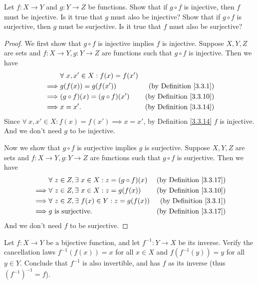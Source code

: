 \begin{exercise}\label{ex 3.3.5}
Let \(f : X \to Y\) and \(g : Y \to Z\) be functions.
Show that if \(g \circ f\) is injective, then \(f\) must be injective.
Is it true that \(g\) must also be injective?
Show that if \(g \circ f\) is surjective, then \(g\) must be surjective.
Is it true that \(f\) must also be surjective?
\end{exercise}

\begin{proof}
We first show that \(g \circ f\) is injective implies \(f\) is injective.
Suppose \(X, Y, Z\) are sets and \(f : X \to Y, g : Y \to Z\) are functions such that \(g \circ f\) is injective.
Then we have
\begin{align*}
& \forall\ x, x' \in X : f(x) = f(x') \\
\implies & g(f(x)) = g(f(x')) & \text{(by Definition \ref{3.3.1})} \\
\implies & (g \circ f)(x) = (g \circ f)(x') & \text{(by Definition \ref{3.3.10})} \\
\implies & x = x'. & \text{(by Definition \ref{3.3.14})}
\end{align*}
Since \(\forall\ x, x' \in X : f(x) = f(x') \implies x = x'\), by Definition \ref{3.3.14} \(f\) is injective.
And we don't need \(g\) to be injective.

Now we show that \(g \circ f\) is surjective implies \(g\) is surjective.
Suppose \(X, Y, Z\) are sets and \(f : X \to Y, g : Y \to Z\) are functions such that \(g \circ f\) is surjective.
Then we have
\begin{align*}
& \forall\ z \in Z, \exists\ x \in X : z = (g \circ f)(x) & \text{(by Definition \ref{3.3.17})} \\
\implies & \forall\ z \in Z, \exists\ x \in X : z = g(f(x)) & \text{(by Definition \ref{3.3.10})} \\
\implies & \forall\ z \in Z, \exists\ f(x) \in Y : z = g(f(x)) & \text{(by Definition \ref{3.3.1})} \\
\implies & g \text{ is surjective}. & \text{(by Definition \ref{3.3.17})}
\end{align*}
And we don't need \(f\) to be surjective.
\end{proof}

\begin{exercise}\label{ex 3.3.6}
Let \(f : X \to Y\) be a bijective function, and let \(f^{-1} : Y \to X\) be its inverse.
Verify the cancellation laws \(f^{-1}(f(x)) = x\) for all \(x \in X\) and \(f(f^{-1}(y)) = y\) for all \(y \in Y\).
Conclude that \(f^{-1}\) is also invertible, and has \(f\) as its inverse (thus \((f^{-1})^{-1} = f\)).
\end{exercise}

